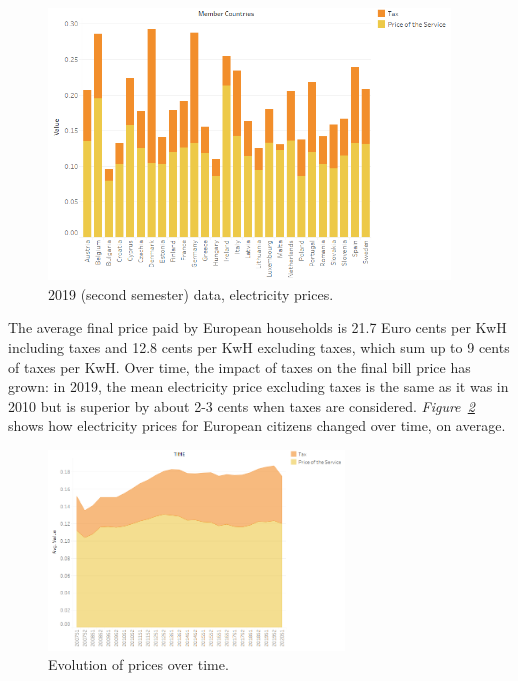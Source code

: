\documentclass[a4paper,12pt]{book}
\begin{document}
\begin{figure}[hbt]
\begin{center}
\captionsetup{justification=centering}
\includegraphics[width=0.95\textwidth]{Images/Taxes.png}
\caption{2019 (second semester) data, electricity prices. }
\label{fig:2019}
\end{center}
\end{figure}

The average final price paid by European households is 21.7 Euro cents per KwH including taxes and 12.8 cents per KwH excluding taxes, which sum up to 9 cents of taxes per KwH. Over time, the impact of taxes on the final bill price has grown: in 2019, the mean electricity price excluding taxes is the same as it was in 2010 but is superior by about 2-3 cents when taxes are considered. \textit{Figure~\ref{fig:TaxesTime}} shows how electricity prices for European citizens changed over time, on average.

\begin{figure}[tb]
\begin{center}
\captionsetup{justification=centering}
\includegraphics[width=0.7\textwidth]{Images/TaxesTime.png}
\caption{Evolution of prices over time. }
\label{fig:TaxesTime}
\end{center}
\end{figure}
\end{document}
